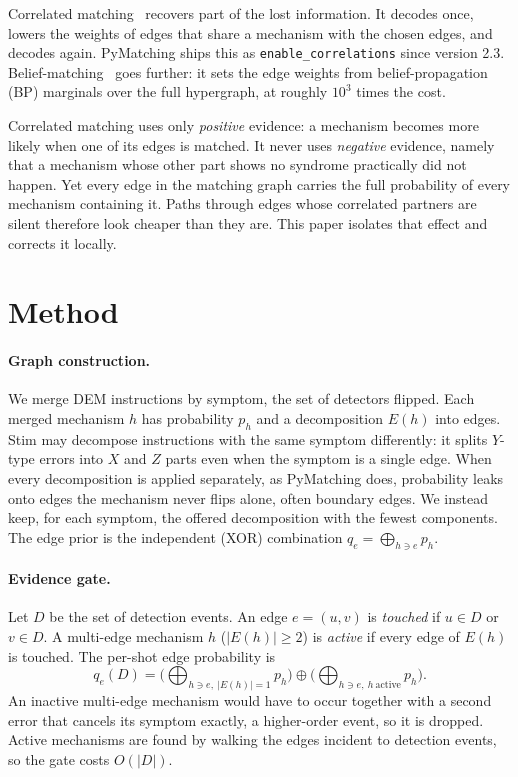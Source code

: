 \documentclass[aps,pra,twocolumn,superscriptaddress,nofootinbib]{revtex4-2}
\begin{document}
Correlated matching~\cite{fowler2013optimal} recovers part of the lost
information. It decodes once, lowers the weights of edges that share a
mechanism with the chosen edges, and decodes again. PyMatching ships this as
\texttt{enable\_correlations} since version 2.3. Belief-matching~\cite{higgott2023improved}
goes further: it sets the edge weights from belief-propagation (BP) marginals
over the full hypergraph, at roughly $10^3$ times the cost.

Correlated matching uses only \emph{positive} evidence: a mechanism becomes
more likely when one of its edges is matched. It never uses \emph{negative}
evidence, namely that a mechanism whose other part shows no syndrome
practically did not happen. Yet every edge in the matching graph carries the
full probability of every mechanism containing it. Paths through edges whose
correlated partners are silent therefore look cheaper than they are. This
paper isolates that effect and corrects it locally.

\section{Method}

\paragraph{Graph construction.}
We merge DEM instructions by symptom, the set of detectors flipped. Each
merged mechanism $h$ has probability $p_h$ and a decomposition $E(h)$ into
edges. Stim may decompose instructions with the same symptom differently: it
splits $Y$-type errors into $X$ and $Z$ parts even when the symptom is a
single edge. When every decomposition is applied separately, as PyMatching
does, probability leaks onto edges the mechanism never flips alone, often
boundary edges. We instead keep, for each symptom, the offered decomposition
with the fewest components. The edge prior is the independent (XOR)
combination
$q_e = \bigoplus_{h \ni e} p_h$.

\paragraph{Evidence gate.}
Let $D$ be the set of detection events. An edge $e=(u,v)$ is \emph{touched}
if $u \in D$ or $v \in D$. A multi-edge mechanism $h$ ($|E(h)|\ge2$) is
\emph{active} if every edge of $E(h)$ is touched. The per-shot edge
probability is
\begin{equation}
  q_e(D) = \Big(\bigoplus_{h \ni e,\ |E(h)|=1} p_h\Big) \oplus
           \Big(\bigoplus_{h \ni e,\ h\ \mathrm{active}} p_h\Big).
\end{equation}
An inactive multi-edge mechanism would have to occur together with a second
error that cancels its symptom exactly, a higher-order event, so it is
dropped. Active mechanisms are found by walking the edges incident to
detection events, so the gate costs $O(|D|)$.
\end{document}
